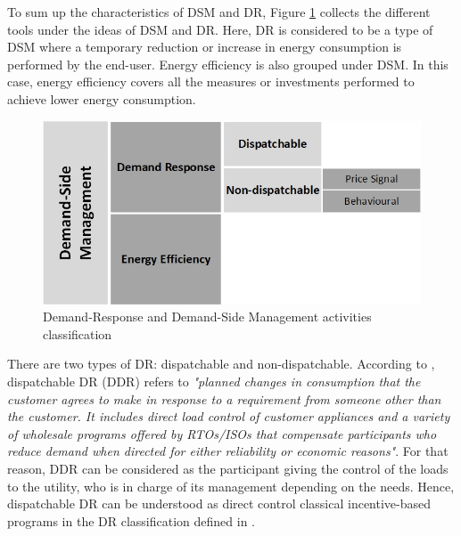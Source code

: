 To sum up the characteristics of DSM and DR, Figure \ref{fig:2.9} collects the different tools under the ideas of DSM and DR. Here, DR is considered to be a type of DSM where a temporary reduction or increase in energy consumption is performed by the end-user. Energy efficiency is also grouped under DSM. In this case, energy efficiency covers all the measures or investments performed to achieve lower energy consumption.

\begin{figure}[]
	\centering
	\includegraphics[width=0.8\columnwidth ]{ChapterIntro/Figures/DRDSM_BW.jpg}
		\caption{Demand-Response and Demand-Side Management activities classification} 
	\label{fig:2.9}
\end{figure}

There are two types of DR: dispatchable and non-dispatchable. According to \cite{DNVGLEnergy2014}, dispatchable DR (DDR) refers to \textit{"planned changes in consumption that the customer agrees to make in response to a requirement from someone other than the customer. It includes direct load control of customer appliances and a variety of wholesale programs offered by RTOs/ISOs that compensate participants who reduce demand when directed for either reliability or economic reasons"}. For that reason, DDR can be considered as the participant giving the control of the loads to the utility, who is in charge of its management depending on the needs. Hence, dispatchable DR can be understood as direct control classical incentive-based programs in the DR classification defined in \cite{albadi2008summary}.

